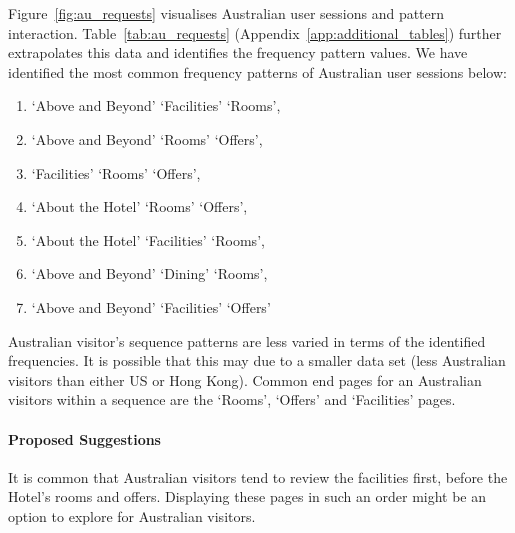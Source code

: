 Figure~\ref{fig:au_requests} visualises Australian user sessions and pattern interaction. Table~\ref{tab:au_requests}  (Appendix~\ref{app:additional_tables}) further extrapolates this data and identifies the frequency pattern values. We have identified the most common frequency patterns of Australian user sessions below:

\begin{enumerate}
  \item `Above and Beyond' \ra{} `Facilities' \ra{} `Rooms',
  \item `Above and Beyond' \ra{} `Rooms' \ra{} `Offers',
  \item `Facilities' \ra{} `Rooms' \ra{} `Offers',
  \item `About the Hotel' \ra{} `Rooms' \ra{} `Offers',
  \item `About the Hotel' \ra{} `Facilities' \ra{} `Rooms',
  \item `Above and Beyond' \ra{} `Dining' \ra{} `Rooms',
  \item `Above and Beyond' \ra{} `Facilities' \ra{} `Offers'
\end{enumerate}

Australian visitor's sequence patterns are less varied in terms of the identified frequencies. It is possible that this may due to a smaller data set (less Australian visitors than either US or Hong Kong). Common end pages for an Australian visitors within a sequence are the `Rooms', `Offers' and `Facilities' pages.

\paragraph{Proposed Suggestions} It is common that Australian visitors tend to review the facilities first, before the Hotel's rooms and offers. Displaying these pages in such an order might be an option to explore for Australian visitors.

\newpage
\begin{landscape}
\pagestyle{empty}
\end{landscape}